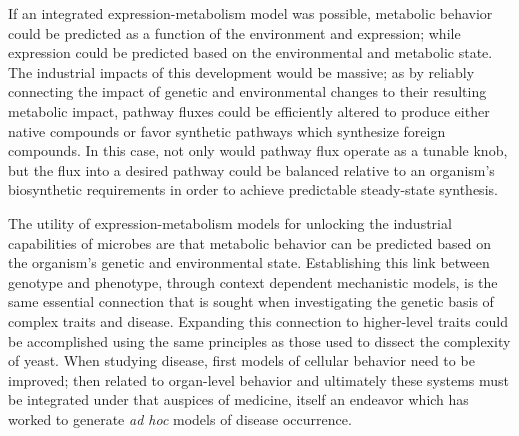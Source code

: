 If an integrated expression-metabolism model was possible, metabolic behavior could be predicted as a function of the environment and expression; while expression could be predicted based on the environmental and metabolic state. The industrial impacts of this development would be massive; as by reliably connecting the impact of genetic and environmental changes to their resulting metabolic impact, pathway fluxes could be efficiently altered to produce either native compounds or favor synthetic pathways which synthesize foreign compounds. In this case, not only would pathway flux operate as a tunable knob, but the flux into a desired pathway could be balanced relative to an organism's biosynthetic requirements in order to achieve predictable steady-state synthesis.

The utility of expression-metabolism models for unlocking the industrial capabilities of microbes are that metabolic behavior can be predicted based on the organism's genetic and environmental state. Establishing this link between genotype and phenotype, through context dependent mechanistic models, is the same essential connection that is sought when investigating the genetic basis of complex traits and disease. Expanding this connection to higher-level traits could be accomplished using the same principles as those used to dissect the complexity of yeast. When studying disease, first models of cellular behavior need to be improved; then related to organ-level behavior and ultimately these systems must be integrated under that auspices of medicine, itself an endeavor which has worked to generate \textit{ad hoc} models of disease occurrence. 
